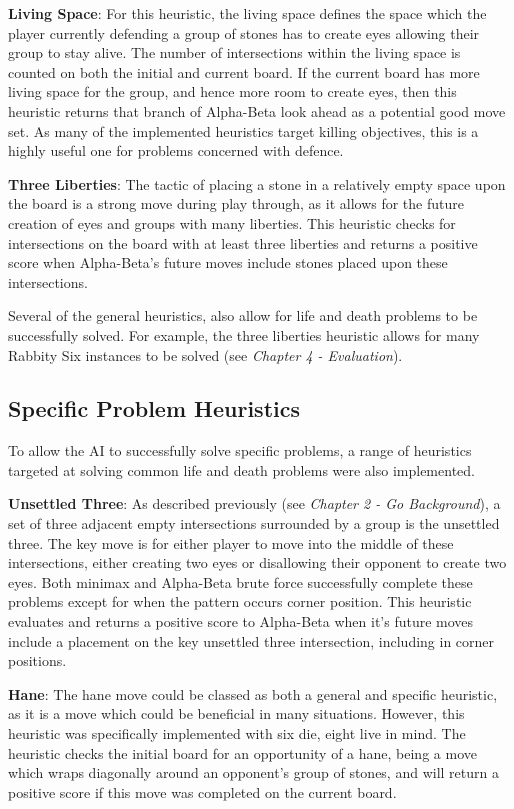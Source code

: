 \documentclass{l3proj}
\begin{document}
\textbf{Living Space}: For this heuristic, the living space defines the space which the player currently defending a group of stones has to create eyes allowing their group to stay alive. The number of intersections within the living space is counted on both the initial and current board. If the current board has more living space for the group, and hence more room to create eyes, then this heuristic returns that branch of Alpha-Beta look ahead as a potential good move set. As many of the implemented heuristics target killing objectives, this is a highly useful one for problems concerned with defence.

\textbf{Three Liberties}: The tactic of placing a stone in a relatively empty space upon the board is a strong move during play through, as it allows for the future creation of eyes and groups with many liberties. This heuristic checks for intersections on the board with at least three liberties and returns a positive score when Alpha-Beta's future moves include stones placed upon these intersections.

Several of the general heuristics, also allow for life and death problems to be successfully solved. For example, the three liberties heuristic allows for many Rabbity Six instances to be solved (see \textit{Chapter 4 - Evaluation}).

\subsection{Specific Problem Heuristics}

To allow the AI to successfully solve specific problems, a range of heuristics targeted at solving common life and death problems were also implemented.

\textbf{Unsettled Three}: As described previously (see \textit{Chapter 2 - Go Background}), a set of three adjacent empty intersections surrounded by a group is the unsettled three. The key move is for either player to move into the middle of these intersections, either creating two eyes or disallowing their opponent to create two eyes. Both minimax and Alpha-Beta brute force successfully complete these problems except for when the pattern occurs corner position. This heuristic evaluates and returns a positive score to Alpha-Beta when it's future moves include a placement on the key unsettled three intersection, including in corner positions.

\textbf{Hane}: The hane move could be classed as both a general and specific heuristic, as it is a move which could be beneficial in many situations. However, this heuristic was specifically implemented with six die, eight live in mind. The heuristic checks the initial board for an opportunity of a hane, being a move which wraps diagonally around an opponent's group of stones, and will return a positive score if this move was completed on the current board.
\end{document}
